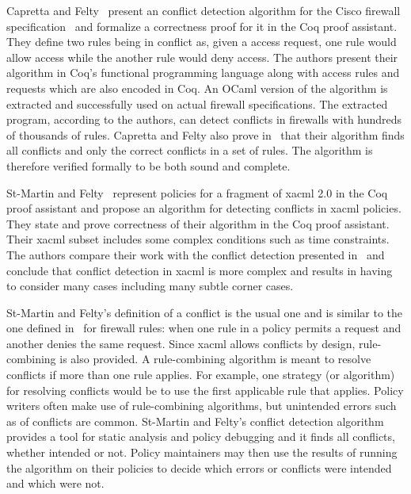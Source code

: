 Capretta and Felty~\cite{CaprettaSFM07} present an conflict detection algorithm for the Cisco firewall specification~\cite{ciscofirewall} and formalize a correctness proof for it in the Coq proof assistant. They define two rules being in conflict as, given a access request, one rule would allow access while the another rule would deny access. The authors present their algorithm in Coq's functional programming language along with access rules and requests which are also encoded in Coq. An OCaml version of
the algorithm is extracted and successfully used on actual firewall specifications. The extracted program, according to the authors, can detect conflicts in firewalls with hundreds of thousands of rules. Capretta and Felty also prove in~\cite{CaprettaSFM07} that their algorithm finds all conflicts and only the correct conflicts in a set of rules. The algorithm is therefore verified formally to be both sound and complete.

St-Martin and Felty~\cite{Stmartin} represent policies for a fragment of \ac{xacml} 2.0 in the Coq proof assistant and propose an algorithm for detecting conflicts in \ac{xacml} policies. They state and prove correctness of their algorithm in the Coq proof assistant. Their \ac{xacml} subset includes some complex conditions such as time constraints. The authors compare their work with the conflict detection presented in~\cite{CaprettaSFM07} and conclude that conflict detection in \ac{xacml} is more complex and results in having to consider many cases including many subtle corner cases. 

St-Martin and Felty's definition of a conflict is the usual one and is similar to the one defined in~\cite{CaprettaSFM07} for firewall rules: when one rule in a policy permits a request and another denies the same request. Since \ac{xacml} allows conflicts by design, rule-combining is also provided. A rule-combining algorithm is meant to resolve conflicts if more than one rule applies. For example, one strategy (or algorithm) for resolving conflicts would be to use the first applicable rule that applies. Policy writers often make use of rule-combining algorithms, but unintended errors such as of conflicts are common.
St-Martin and Felty's conflict detection algorithm provides a tool for static analysis and policy debugging and it finds all conflicts, whether intended or not. Policy maintainers may then use the results of running the algorithm on their policies to decide which errors or conflicts were intended and which were not.





























